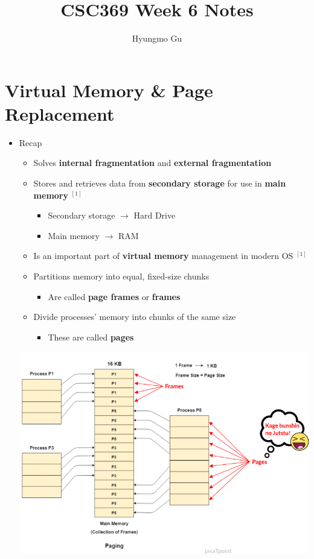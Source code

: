 \documentclass[12pt]{article}
\begin{document}
\title{CSC369 Week 6 Notes}
\author{Hyungmo Gu}
\maketitle

\bigskip

\section{Virtual Memory \& Page Replacement}

\bigskip

\begin{itemize}
    \item Recap
    \begin{itemize}
        \item Solves \textbf{internal fragmentation} and \textbf{external fragmentation}
        \item Stores and retrieves data from \textbf{secondary storage} for use
        in \textbf{main memory} $^{[1]}$
        \begin{itemize}
            \item Secondary storage $\to$ Hard Drive
            \item Main memory $\to$ RAM
        \end{itemize}
        \item Is an important part of \textbf{virtual memory} management in modern
        OS $^{[1]}$
        \item Partitions memory into equal, fixed-size chunks
        \begin{itemize}
            \item Are called \textbf{page frames} or \textbf{frames}
        \end{itemize}
        \item Divide processes' memory into chunks of the same size
        \begin{itemize}
            \item These are called \textbf{pages}
        \end{itemize}
    \end{itemize}

    \begin{center}
    \includegraphics[width=0.8\linewidth]{../images/week_6_notes_1_1.png}
    \end{center}


\end{itemize}
\end{document}
